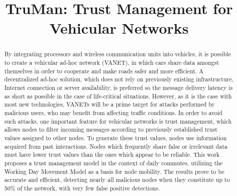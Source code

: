 \documentclass[conference]{IEEEtran}
\begin{document}
\title{TruMan: Trust Management for Vehicular Networks}



\author{
}


\maketitle

\begin{abstract}
By integrating processors and wireless communication units into vehicles, it is possible to create a vehicular ad-hoc network (VANET), in which cars share data amongst themselves in order to cooperate and make roads safer and more efficient.
A decentralized ad-hoc solution, which does not rely on previously existing infrastructure, Internet connection or server availability, is preferred so the message delivery latency is as short as possible in the case of life-critical situations.
However, as it is the case with most new technologies, VANETs will be a prime target for attacks performed by malicious users, who may benefit from affecting traffic conditions.
In order to avoid such attacks, one important feature for vehicular networks is trust management, which allows nodes to filter incoming messages according to previously established trust values assigned to other nodes.
To generate these trust values, nodes use information acquired from past interactions. Nodes which frequently share false or irrelevant data must have lower trust values than the ones which appear to be reliable.
This work proposes a trust management model in the context of daily commutes, utilizing the Working Day Movement Model as a basis for node mobility.
The results prove to be accurate and efficient, detecting nearly all malicious nodes when they constitute up to 50\% of the network, with very few false positive detections.
\end{abstract}
\end{document}
